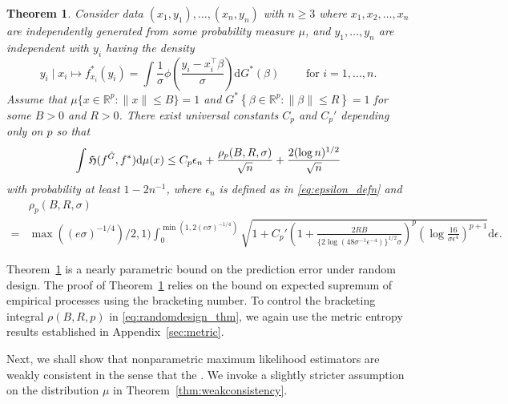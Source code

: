 \documentclass[11pt]{article}
\numberwithin{equation}{section}
\newtheorem{theorem}{Theorem}[section]
\newcommand{\T}{ \top }
\def\qt#1{\qquad\text{#1}}
\newcommand{\errrd}{\rho}
\begin{document}
\begin{theorem}

Consider data $(x_1, y_1), \dots, (x_n, y_n)$ with $n \geq 3$ where  $x_1,x_2,\dots, x_n$ are independently generated from some probability measure $\mu$, and $y_1,\dots, y_n$ are independent with $y_i$ having the density
\begin{equation}
y_i \mid x_i \mapsto f^*_{x_i}(y_i) =\int \frac{1}{\sigma}\phi\left(\frac{y_i- x_i^\T\beta}{\sigma} \right) \mathrm{d} G^*(\beta)\qt{ for $i = 1,\dots,n$}.
\label{eq:generate}
\end{equation}
Assume that $\mu\{x \in \mathbb{R}^p :\| x \| \leq B\} = 1$ 
and $G^* \left\{\beta \in \mathbb{R}^p : \|\beta\| \leq R \right\} = 1$ for some $B > 0$ and $R > 0$. There exist universal  constants $C_p$ and $C_p'$ depending only on $p$ so that 
\begin{equation}
\int \mathfrak{H}( f^{\hat{G}}, f^{*})\mathrm{d} \mu(x) \\
\leq C_p \epsilon_n + \frac{\errrd_p(B,R,\sigma) }{\sqrt{n}} + \frac{2 (\log n)^{1/2}}{\sqrt{n}}
\label{eq:randomdesign_thm}
\end{equation}{}
with probability at least $1- 2n^{-1}$, where $\epsilon_n$ is defined as in \eqref{eq:epsilon_defn} and
\[
\begin{split}
&\errrd_p(B,R,\sigma)\\
 =&\max((e\sigma)^{-1/4})/2,1) \int_{0}^{\min(1,2(e\sigma)^{-1/4}) }\sqrt{1+C_p'  \left(1+ \frac{2R B}{\{2 \log(48\sigma^{-1}\epsilon^{-4})\}^{1/2} \sigma} \right)^p \left(\log \frac{16}{\sigma \epsilon^4}\right)^{p+1} }\mathrm{d} \epsilon.
\end{split}
\]


\label{them:randomdesign_predictionerror}
\end{theorem}

Theorem~\ref{them:randomdesign_predictionerror} is a nearly parametric bound on the prediction error under random design. The proof of Theorem~\ref{them:randomdesign_predictionerror} relies on the bound on expected supremum of empirical processes using the bracketing number. To control the bracketing integral $\errrd( B,R,p)$ in \eqref{eq:randomdesign_thm}, we again use the metric entropy results established in Appendix~\ref{sec:metric}. 


Next, we shall show that nonparametric maximum likelihood estimators are weakly consistent in the sense that the . We invoke a slightly stricter assumption on the distribution $\mu$ in Theorem~\ref{thm:weakconsistency}.
\end{document}
